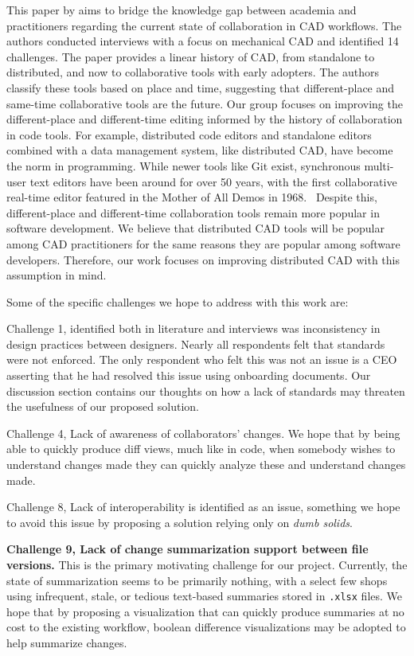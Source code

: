 \documentclass[sigconf,authorversion,nonacm]{acmart}
\begin{document}
This paper by \citet{cheng2023age} aims to bridge the knowledge gap between academia and practitioners regarding the current state of collaboration in CAD workflows.
The authors conducted interviews with a focus on mechanical CAD and identified 14 challenges. The paper provides a linear history of CAD, from standalone to distributed, and now to collaborative tools with early adopters.
The authors classify these tools based on place and time, suggesting that different-place and same-time collaborative tools are the future.
Our group focuses on improving the different-place and different-time editing informed by the history of collaboration in code tools.
For example, distributed code editors and standalone editors combined with a data management system, like distributed CAD, have become the norm in programming.
While newer tools like Git exist, synchronous multi-user text editors have been around for over 50 years, with the first collaborative real-time editor featured in the Mother of All Demos in 1968.~\cite{motherofalldemos}
Despite this, different-place and different-time collaboration tools remain more popular in software development.
We believe that distributed CAD tools will be popular among CAD practitioners for the same reasons they are popular among software developers. Therefore, our work focuses on improving distributed CAD with this assumption in mind.

Some of the specific challenges we hope to address with this work are:

Challenge 1, identified both in literature and interviews was inconsistency in design practices between designers.
Nearly all respondents felt that standards were not enforced.
The only respondent who felt this was not an issue is a CEO asserting that he had resolved this issue using onboarding documents.
Our discussion section contains our thoughts on how a lack of standards may threaten the usefulness of our proposed solution.

Challenge 4, Lack of awareness of collaborators' changes.
We hope that by being able to quickly produce diff views, much like in code, when somebody wishes to understand changes made they can quickly analyze these and understand changes made.

Challenge 8, Lack of interoperability is identified as an issue, something we hope to avoid this issue by proposing a solution relying only on \emph{dumb solids}.

\textbf{Challenge 9, Lack of change summarization support between file versions.}
This is the primary motivating challenge for our project.
Currently, the state of summarization seems to be primarily nothing, with a select few shops using infrequent, stale, or tedious text-based summaries stored in \texttt{.xlsx} files.
We hope that by proposing a visualization that can quickly produce summaries at no cost to the existing workflow, boolean difference visualizations may be adopted to help summarize changes.
\end{document}
